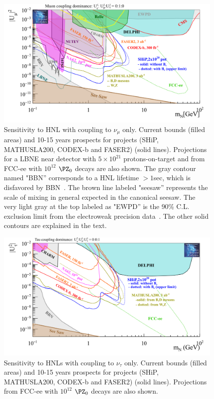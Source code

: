 \begin{figure}[h]
  \centering
  \includegraphics[width=.90\textwidth]{Figures/c3/HNL_bc7_pbc_2.png}
    \caption{Sensitivity to HNL with coupling to $\nu_\mu$ only. Current bounds (filled areas) and 10-15 years prospects for projects
(SHiP, MATHUSLA200, CODEX-b and FASER2) (solid lines). Projections for a LBNE
near detector with $5\times 10^{21}$ protons-on-target and from FCC-ee with $10^{12}$ $\PZ_0$ decays are also shown. The gray contour named "BBN'' corresponds to a HNL lifetime $>1$sec,
which is disfavored by BBN~\cite{Ruchayskiy_2012}. The brown line
labeled "seesaw'' represents the scale of mixing in general expected
in the canonical seesaw. The very light gray at the top
labeled as "EWPD'' is the 90\% C.L. exclusion limit from the
electroweak precision data~\cite{Antusch_2015}. The other solid
contours are explained in the text.}
  \label{fig:HNL_bc7_pbc_2}
\end{figure}

\begin{figure}[h]
  \centering
  \includegraphics[width=.90\textwidth]{Figures/c3/HNL_bc8_pbc_2.png}
    \caption{Sensitivity to HNLs with coupling to $\nu_\tau$ only. Current bounds (filled areas) and 10-15 years prospects for projects
(SHiP, MATHUSLA200, CODEX-b and FASER2) (solid lines). Projections from FCC-ee with $10^{12}$ $\PZ_0$ decays are also shown.}
  \label{fig:HNL_bc8_pbc_2}
\end{figure}

